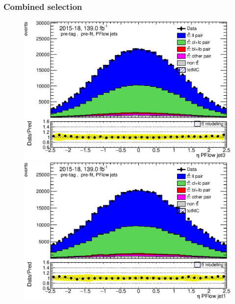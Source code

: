\documentclass[letterpaper,12pt]{article}
\begin{document}
\subsubsection{Combined selection}
\label{sec:appendix_combined_selection}
\begin{figure}[H]
	\begin{minipage}[b]{.45\textwidth}
	\centering
	\includegraphics[width=1\textwidth]{Oct_distributions/pretagNoRwDL1rwithhighpTPFlow_scaledall/DataMC_J0_eta.eps}
	\end{minipage}\hfill
	\begin{minipage}[b]{.45\textwidth}
	\centering
	\includegraphics[width=1\textwidth]{Oct_distributions/pretagNoRwDL1rwithhighpTPFlow_scaledall/DataMC_J1_eta.eps}
	\end{minipage}\hfill
	\begin{minipage}[b]{.45\textwidth}
	\centering

\end{minipage}
\end{figure}
\end{document}
